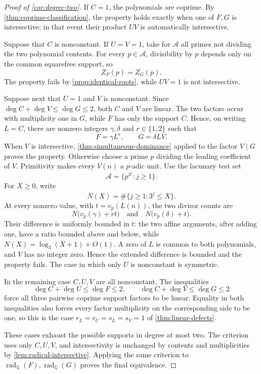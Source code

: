 \documentclass[11pt]{amsart}
\newcommand{\Q}{\mathbb Q}
\newcommand{\radQ}{\operatorname{rad}_{\Q}}
\theoremstyle{definition}
\begin{document}
\begin{proof}[Proof of \cref{cor:degree-two}]
If \(C=1\), the polynomials are coprime.  By
\cref{thm:coprime-classification}, the property holds exactly when one of
\(F,G\) is intersective; in that event their product \(UV\) is automatically
intersective.

Suppose that \(C\) is nonconstant.  If \(U=V=1\), take for
\(\mathcal A\) all primes not dividing the two polynomial contents.  For
every \(p\in\mathcal A\), divisibility by \(p\) depends only on the common
squarefree support, so
\[
  Z_F(p)=Z_G(p).
\]
The property fails by \cref{prop:identical-roots}, while \(UV=1\) is not
intersective.

Suppose next that \(U=1\) and \(V\) is nonconstant.  Since
\(\deg C+\deg V\le\deg G\le2\), both \(C\) and \(V\) are linear.  The two
factors occur with multiplicity one in \(G\), while \(F\) has only the
support \(C\).  Hence, on writing \(L=C\), there are nonzero integers
\(\gamma,\delta\) and \(r\in\{1,2\}\) such that
\[
  F=\gamma L^r,\qquad G=\delta LV.
\]
When \(V\) is intersective,
\cref{thm:simultaneous-dominance} applied to the factor \(V\mid G\) proves
the property.  Otherwise choose a prime \(p\) dividing the leading
coefficient of \(V\).  Primitivity makes every \(V(n)\) a \(p\)-adic unit.
Use the lacunary test set
\[
  \mathcal A=\{p^{3^j}:j\ge1\}.
\]
For \(X\ge0\), write
\[
  N(X)=\#\{j\ge1:3^j\le X\}.
\]
At every nonzero value, with \(t=v_p(L(n))\), the two divisor counts are
\[
  N\bigl(v_p(\gamma)+rt\bigr)
  \quad\text{and}\quad
  N\bigl(v_p(\delta)+t\bigr).
\]
Their difference is uniformly bounded in \(t\): the two affine arguments,
after adding one, have a ratio bounded above and below, while
\(N(X)=\log_3(X+1)+O(1)\).  A zero of \(L\) is common to both polynomials,
and \(V\) has no integer zero.  Hence the extended difference is bounded and
the property fails.  The case in which only \(U\) is nonconstant is
symmetric.

In the remaining case \(C,U,V\) are all nonconstant.  The inequalities
\[
  \deg C+\deg U\le\deg F\le2,
  \qquad
  \deg C+\deg V\le\deg G\le2
\]
force all three pairwise coprime support factors to be linear.  Equality in
both inequalities also forces every factor multiplicity on the corresponding
side to be one, so this is the case
\(r_L=r_U=s_L=s_V=1\) of \cref{thm:linear-defects}.

These cases exhaust the possible supports in degree at most two.  The
criterion uses only \(C,U,V\), and intersectivity is unchanged by contents
and multiplicities by \cref{lem:radical-intersective}.  Applying the same
criterion to \(\radQ(F),\radQ(G)\) proves the final equivalence.
\end{proof}
\end{document}

